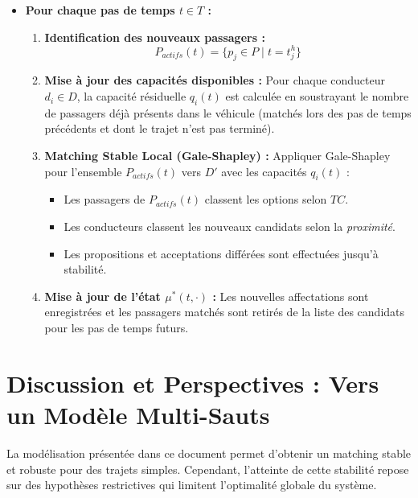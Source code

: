 \documentclass[12pt, a4paper]{article}
\begin{document}
\begin{itemize}
    \item[] \textbf{Pour chaque pas de temps $t \in T$ :}
    \begin{enumerate}
        \item \textbf{Identification des nouveaux passagers :}
        $$ P_{actifs}(t) = \{p_j \in P \mid t = t^h_j \} $$

        \item \textbf{Mise à jour des capacités disponibles :}
        Pour chaque conducteur $d_i \in D$, la capacité résiduelle $q_i(t)$ est calculée en soustrayant le nombre de passagers déjà présents dans le véhicule (matchés lors des pas de temps précédents et dont le trajet n'est pas terminé).
        \item \textbf{Matching Stable Local (Gale-Shapley) :}
        Appliquer Gale-Shapley pour l'ensemble $P_{actifs}(t)$ vers $D'$ avec les capacités $q_i(t)$ :
        \begin{itemize}
            \item Les passagers de $P_{actifs}(t)$ classent les options selon $TC$.
            \item Les conducteurs classent les nouveaux candidats selon la \textit{proximité}.
            \item Les propositions et acceptations différées sont effectuées jusqu'à stabilité.
        \end{itemize}

        \item \textbf{Mise à jour de l'état $\mu^*(t, \cdot)$ :}
        Les nouvelles affectations sont enregistrées et les passagers matchés sont retirés de la liste des candidats pour les pas de temps futurs.
    \end{enumerate}
\end{itemize}

\section{Discussion et Perspectives : Vers un Modèle Multi-Sauts}
La modélisation présentée dans ce document permet d'obtenir un matching stable et robuste pour des trajets simples. Cependant, l'atteinte de cette stabilité repose sur des hypothèses restrictives qui limitent l'optimalité globale du système.
\end{document}
